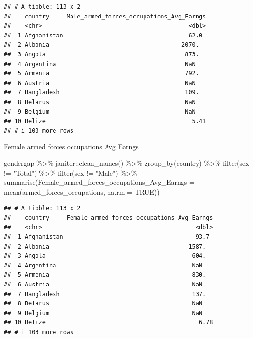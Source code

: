 \documentclass[
]{article}
\newenvironment{Shaded}{\begin{snugshade}}{\end{snugshade}}
\newcommand{\AttributeTok}[1]{\textcolor[rgb]{0.77,0.63,0.00}{#1}}
\newcommand{\ConstantTok}[1]{\textcolor[rgb]{0.00,0.00,0.00}{#1}}
\newcommand{\FunctionTok}[1]{\textcolor[rgb]{0.00,0.00,0.00}{#1}}
\newcommand{\NormalTok}[1]{#1}
\newcommand{\SpecialCharTok}[1]{\textcolor[rgb]{0.00,0.00,0.00}{#1}}
\newcommand{\StringTok}[1]{\textcolor[rgb]{0.31,0.60,0.02}{#1}}
\begin{document}
\begin{verbatim}
## # A tibble: 113 x 2
##    country     Male_armed_forces_occupations_Avg_Earngs
##    <chr>                                          <dbl>
##  1 Afghanistan                                    62.0 
##  2 Albania                                      2070.  
##  3 Angola                                        873.  
##  4 Argentina                                     NaN   
##  5 Armenia                                       792.  
##  6 Austria                                       NaN   
##  7 Bangladesh                                    109.  
##  8 Belarus                                       NaN   
##  9 Belgium                                       NaN   
## 10 Belize                                          5.41
## # i 103 more rows
\end{verbatim}

Female armed forces occupations Avg Earngs

\begin{Shaded}
\begin{Highlighting}[]
\NormalTok{gendergap }\SpecialCharTok{\%\textgreater{}\%}
\NormalTok{  janitor}\SpecialCharTok{::}\FunctionTok{clean\_names}\NormalTok{() }\SpecialCharTok{\%\textgreater{}\%}
  \FunctionTok{group\_by}\NormalTok{(country) }\SpecialCharTok{\%\textgreater{}\%} 
   \FunctionTok{filter}\NormalTok{(sex }\SpecialCharTok{!=} \StringTok{"Total"}\NormalTok{) }\SpecialCharTok{\%\textgreater{}\%}
  \FunctionTok{filter}\NormalTok{(sex }\SpecialCharTok{!=} \StringTok{"Male"}\NormalTok{) }\SpecialCharTok{\%\textgreater{}\%}
  \FunctionTok{summarise}\NormalTok{(}\AttributeTok{Female\_armed\_forces\_occupations\_Avg\_Earngs =} \FunctionTok{mean}\NormalTok{(armed\_forces\_occupations, }\AttributeTok{na.rm =} \ConstantTok{TRUE}\NormalTok{))}
\end{Highlighting}
\end{Shaded}

\begin{verbatim}
## # A tibble: 113 x 2
##    country     Female_armed_forces_occupations_Avg_Earngs
##    <chr>                                            <dbl>
##  1 Afghanistan                                      93.7 
##  2 Albania                                        1587.  
##  3 Angola                                          604.  
##  4 Argentina                                       NaN   
##  5 Armenia                                         830.  
##  6 Austria                                         NaN   
##  7 Bangladesh                                      137.  
##  8 Belarus                                         NaN   
##  9 Belgium                                         NaN   
## 10 Belize                                            6.78
## # i 103 more rows
\end{verbatim}
\end{document}
